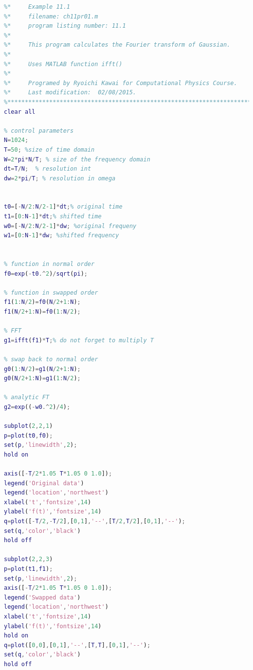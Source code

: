 \bigskip
\noindent
\program
\label{prog:fft_gauss}
\footnotesize
\begin{lstlisting}[language=matlab]
%**************************************************************************
%*     Example 11.1                                                       *
%*     filename: ch11pr01.m                                               *
%*     program listing number: 11.1                                       *
%*                                                                        *
%*     This program calculates the Fourier transform of Gaussian.         *
%*                                                                        *
%*     Uses MATLAB function ifft()                                        *
%*                                                                        *
%*     Programed by Ryoichi Kawai for Computational Physics Course.       *
%*     Last modification:  02/08/2015.                                    *
%**************************************************************************
clear all

% control parameters
N=1024;
T=50; %size of time domain
W=2*pi*N/T; % size of the frequency domain
dt=T/N;  % resolution int
dw=2*pi/T; % resolution in omega


t0=[-N/2:N/2-1]*dt;% original time
t1=[0:N-1]*dt;% shifted time
w0=[-N/2:N/2-1]*dw; %original frequeny 
w1=[0:N-1]*dw; %shifted frequency


% function in normal order
f0=exp(-t0.^2)/sqrt(pi);

% function in swapped order
f1(1:N/2)=f0(N/2+1:N);
f1(N/2+1:N)=f0(1:N/2);

% FFT
g1=ifft(f1)*T;% do not forget to multiply T

% swap back to normal order
g0(1:N/2)=g1(N/2+1:N);
g0(N/2+1:N)=g1(1:N/2);

% analytic FT
g2=exp((-w0.^2)/4);

subplot(2,2,1)
p=plot(t0,f0);
set(p,'linewidth',2);
hold on

axis([-T/2*1.05 T*1.05 0 1.0]);
legend('Original data')
legend('location','northwest')
xlabel('t','fontsize',14)
ylabel('f(t)','fontsize',14)
q=plot([-T/2,-T/2],[0,1],'--',[T/2,T/2],[0,1],'--');
set(q,'color','black')
hold off

subplot(2,2,3)
p=plot(t1,f1);
set(p,'linewidth',2);
axis([-T/2*1.05 T*1.05 0 1.0]);
legend('Swapped data')
legend('location','northwest')
xlabel('t','fontsize',14)
ylabel('f(t)','fontsize',14)
hold on
q=plot([0,0],[0,1],'--',[T,T],[0,1],'--');
set(q,'color','black')
hold off


\end{lstlisting}

